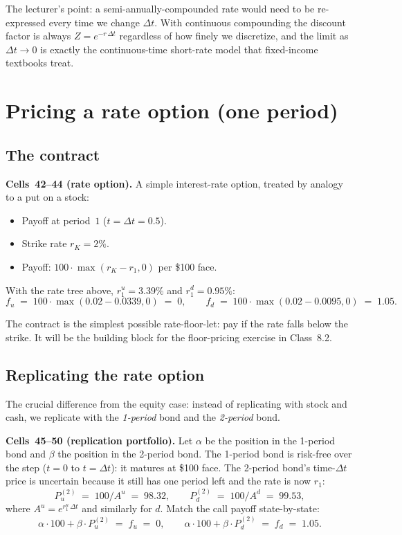 The lecturer's point: a semi-annually-compounded rate would
need to be re-expressed every time we change $\Delta t$. With
continuous compounding the discount factor is always
$Z = e^{-r\,\Delta t}$ regardless of how finely we discretize, and
the limit as $\Delta t \to 0$ is exactly the continuous-time
short-rate model that fixed-income textbooks treat.

\section{Pricing a rate option (one period)}\label{L8-sec:rateoption}

\subsection{The contract}\label{L8-sec:contract}

\begin{keyblock}
\textbf{Cells~42--44 (rate option).}
A simple interest-rate option, treated by analogy to a put on a stock:
\begin{itemize}
  \item Payoff at period~$1$ ($t = \Delta t = 0.5$).
  \item Strike rate $r_K = 2\%$.
  \item Payoff: $100 \cdot \max(r_K - r_1, 0)$ per \$100 face.
\end{itemize}
With the rate tree above, $r_1^u = 3.39\%$ and $r_1^d = 0.95\%$:
\[
  f_u \;=\; 100\cdot\max(0.02 - 0.0339, 0) \;=\; 0,
  \qquad
  f_d \;=\; 100\cdot\max(0.02 - 0.0095, 0) \;=\; 1.05.
\]
\end{keyblock}

The contract is the simplest possible rate-floor-let: pay if the
rate falls below the strike. It will be the building block for the
floor-pricing exercise in Class~8.2.

\subsection{Replicating the rate option}\label{L8-sec:repl}

The crucial difference from the equity case: instead of replicating
with stock and cash, we replicate with the \emph{1-period} bond and
the \emph{2-period} bond.

\begin{keyblock}
\textbf{Cells~45--50 (replication portfolio).}
Let $\alpha$ be the position in the 1-period bond and $\beta$ the
position in the 2-period bond. The 1-period bond is risk-free over
the step ($t = 0$ to $t = \Delta t$): it matures at \$100 face.
The 2-period bond's time-$\Delta t$ price is uncertain because it
still has one period left and the rate is now $r_1$:
\[
  P^{(2)}_u \;=\; 100/A^u \;=\; 98.32,
  \qquad
  P^{(2)}_d \;=\; 100/A^d \;=\; 99.53,
\]
where $A^u = e^{r_1^u \,\Delta t}$ and similarly for $d$. Match the
call payoff state-by-state:
\[
  \alpha \cdot 100 + \beta \cdot P^{(2)}_u \;=\; f_u \;=\; 0,
  \qquad
  \alpha \cdot 100 + \beta \cdot P^{(2)}_d \;=\; f_d \;=\; 1.05.
\]
\end{keyblock}

